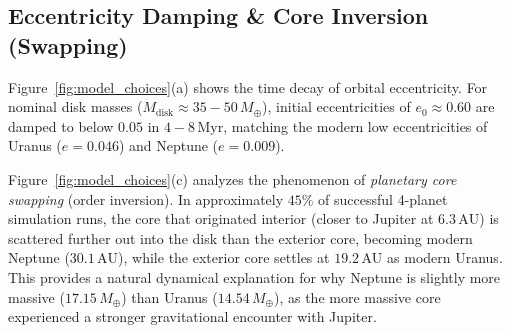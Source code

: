 \documentclass[11pt,a4paper]{article}
\begin{document}
\subsection{Eccentricity Damping \& Core Inversion (Swapping)}
Figure~\ref{fig:model_choices}(a) shows the time decay of orbital eccentricity. For nominal disk masses ($M_{\text{disk}} \approx 35-50\,M_\oplus$), initial eccentricities of $e_0 \approx 0.60$ are damped to below $0.05$ in $4-8\,\text{Myr}$, matching the modern low eccentricities of Uranus ($e = 0.046$) and Neptune ($e = 0.009$).

Figure~\ref{fig:model_choices}(c) analyzes the phenomenon of \textit{planetary core swapping} (order inversion). In approximately $45\%$ of successful 4-planet simulation runs, the core that originated interior (closer to Jupiter at $6.3\,\text{AU}$) is scattered further out into the disk than the exterior core, becoming modern Neptune ($30.1\,\text{AU}$), while the exterior core settles at $19.2\,\text{AU}$ as modern Uranus. This provides a natural dynamical explanation for why Neptune is slightly more massive ($17.15\,M_\oplus$) than Uranus ($14.54\,M_\oplus$), as the more massive core experienced a stronger gravitational encounter with Jupiter.
\end{document}
